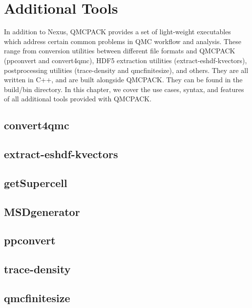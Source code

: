 \chapter{Additional Tools}
\label{chap:additional_tools}
In addition to Nexus, QMCPACK provides a set of light-weight executables which address certain
common problems in QMC workflow and analysis.  These range from conversion utilities between 
different file formats and QMCPACK (ppconvert and convert4qmc), HDF5 extraction utilities (extract-eshdf-kvectors), postprocessing utilities (trace-density and qmcfinitesize), and others.  They are all written in C++, and are built alongside QMCPACK.  They can be found in the build/bin directory.  In this chapter, we cover the use cases, syntax, and features of all additional tools provided with QMCPACK.  
   
\section{convert4qmc}
\section{extract-eshdf-kvectors}
\section{getSupercell}
\section{MSDgenerator}
\section{ppconvert}
\section{trace-density}
\section{qmcfinitesize}


